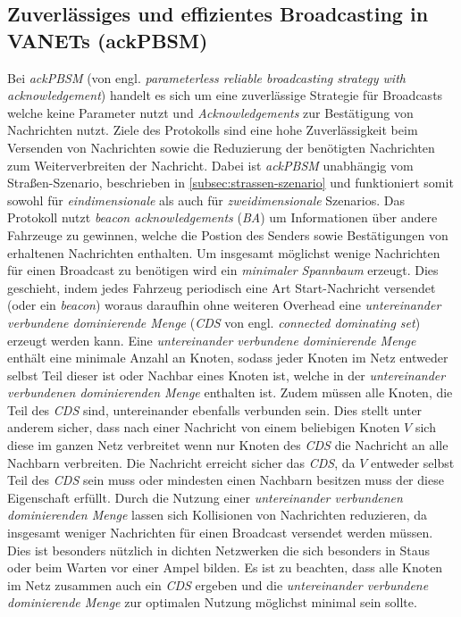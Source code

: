 \documentclass[english,runningheads,a4paper]{llncs}[2018/03/10]
\begin{document}
\subsection{Zuverlässiges und effizientes Broadcasting in VANETs (ackPBSM)}
Bei \textit{ackPBSM} (von engl. \textit{parameterless reliable broadcasting strategy with acknowledgement}) handelt es sich um eine zuverlässige Strategie für Broadcasts welche keine Parameter nutzt und \textit{Acknowledgements} zur Bestätigung von Nachrichten nutzt.
Ziele des Protokolls sind eine hohe Zuverlässigkeit beim Versenden von Nachrichten sowie die Reduzierung der benötigten Nachrichten zum Weiterverbreiten der Nachricht.
Dabei ist \textit{ackPBSM} unabhängig vom Straßen-Szenario, beschrieben in \ref{subsec:strassen-szenario} und funktioniert somit sowohl für \textit{eindimensionale} als auch für \textit{zweidimensionale} Szenarios.
Das Protokoll nutzt \textit{beacon acknowledgements} (\textit{BA}) um Informationen über andere Fahrzeuge zu gewinnen, welche die Postion des Senders sowie Bestätigungen von erhaltenen Nachrichten enthalten.
Um insgesamt möglichst wenige Nachrichten für einen Broadcast zu benötigen wird ein \textit{minimaler Spannbaum} erzeugt.
Dies geschieht, indem jedes Fahrzeug periodisch eine Art Start-Nachricht versendet (oder ein \textit{beacon}) woraus daraufhin ohne weiteren Overhead eine \textit{untereinander verbundene dominierende Menge} (\textit{CDS} von engl. \textit{connected dominating set}) erzeugt werden kann.
Eine \textit{untereinander verbundene dominierende Menge} enthält eine minimale Anzahl an Knoten, sodass jeder Knoten im Netz entweder selbst Teil dieser ist oder Nachbar eines Knoten ist, welche in der \textit{untereinander verbundenen dominierenden Menge} enthalten ist.
Zudem müssen alle Knoten, die Teil des \textit{CDS} sind, untereinander ebenfalls verbunden sein.
Dies stellt unter anderem sicher, dass nach einer Nachricht von einem beliebigen Knoten $V$ sich diese im ganzen Netz verbreitet wenn nur Knoten des \textit{CDS} die Nachricht an alle Nachbarn verbreiten.
Die Nachricht erreicht sicher das \textit{CDS}, da $V$ entweder selbst Teil des \textit{CDS} sein muss oder mindesten einen Nachbarn besitzen muss der diese Eigenschaft erfüllt.
Durch die Nutzung einer \textit{untereinander verbundenen dominierenden Menge} lassen sich Kollisionen von Nachrichten reduzieren, da insgesamt weniger Nachrichten für einen Broadcast versendet werden müssen.
Dies ist besonders nützlich in dichten Netzwerken die sich besonders in Staus oder beim Warten vor einer Ampel bilden.
Es ist zu beachten, dass alle Knoten im Netz zusammen auch ein \textit{CDS} ergeben und die \textit{untereinander verbundene dominierende Menge} zur optimalen Nutzung möglichst minimal sein sollte\cite{conti2013mobile}.\\
\end{document}
